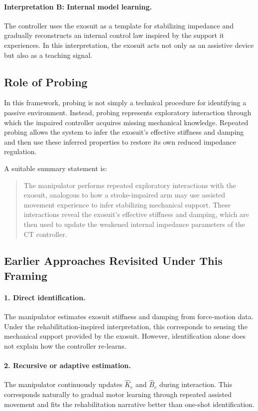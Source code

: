 \documentclass[11pt]{article}
\begin{document}
\paragraph{Interpretation B: Internal model learning.}
The controller uses the exosuit as a template for stabilizing impedance and gradually reconstructs an internal control law inspired by the support it experiences. In this interpretation, the exosuit acts not only as an assistive device but also as a teaching signal.

\subsection{Role of Probing}

In this framework, probing is not simply a technical procedure for identifying a passive environment. Instead, probing represents exploratory interaction through which the impaired controller acquires missing mechanical knowledge. Repeated probing allows the system to infer the exosuit's effective stiffness and damping and then use these inferred properties to restore its own reduced impedance regulation.

A suitable summary statement is:

\begin{quote}
The manipulator performs repeated exploratory interactions with the exosuit, analogous to how a stroke-impaired arm may use assisted movement experience to infer stabilizing mechanical support. These interactions reveal the exosuit's effective stiffness and damping, which are then used to update the weakened internal impedance parameters of the CT controller.
\end{quote}

\subsection{Earlier Approaches Revisited Under This Framing}

\paragraph{1. Direct identification.}
The manipulator estimates exosuit stiffness and damping from force-motion data. Under the rehabilitation-inspired interpretation, this corresponds to sensing the mechanical support provided by the exosuit. However, identification alone does not explain how the controller re-learns.

\paragraph{2. Recursive or adaptive estimation.}
The manipulator continuously updates \(\hat{K}_e\) and \(\hat{B}_e\) during interaction. This corresponds naturally to gradual motor learning through repeated assisted movement and fits the rehabilitation narrative better than one-shot identification.
\end{document}
